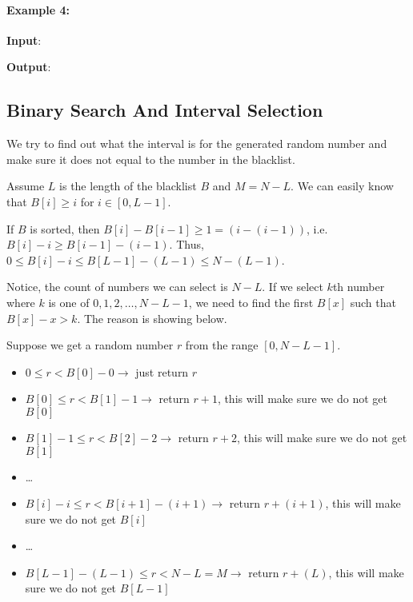 \paragraph{Example 4:}

\begin{flushleft}
\textbf{Input}: 


\fcj{[[4,[2]],[],[],[]]}

\textbf{Output}: \fcj{[null,1,3,1]}
\end{flushleft}

\subsection{Binary Search And Interval Selection}
We try to find out what the interval is for the generated random number and make sure it does not equal to the number in the blacklist.

Assume $L$ is the length of the blacklist $B$ and $M = N -L$. We can easily know that $B[i] \geq i$ for $i\in [0, L-1]$. 

If $B$ is sorted, then $B[i] - B[i-1] \geq 1 = (i-(i-1))$, i.e. $B[i] - i\geq B[i-1] - (i-1)$. Thus, $0\leq B[i] - i\leq B[L-1] - (L-1) \leq N - (L-1)$.

Notice, the count of numbers we can select is $N-L$. If we select $k$th number where $k$ is one of $0, 1, 2, \ldots, N-L-1$, we need to find the first $B[x]$ such that $B[x] - x > k$. The reason is showing below. 

Suppose we get a random number $r$ from the range $[0, N-L-1]$.

\begin{itemize}
    \item $0 \leq r < B[0] - 0 \longrightarrow$ just return $r$  
    \item $B[0] \leq r < B[1] - 1 \longrightarrow$ return $r+1$, this will make sure we do not get $B[0]$
    \item $B[1]-1 \leq r < B[2] - 2 \longrightarrow$ return $r+2$, this will make sure we do not get $B[1]$
    \item \dots
    \item $B[i]-i \leq r < B[i+1] - (i+1) \longrightarrow$ return $r+(i+1)$, this will make sure we do not get $B[i]$
    \item \dots
    \item $B[L-1]-(L-1) \leq r < N - L = M \longrightarrow$ return $r+(L)$, this will make sure we do not get $B[L-1]$
\end{itemize}

